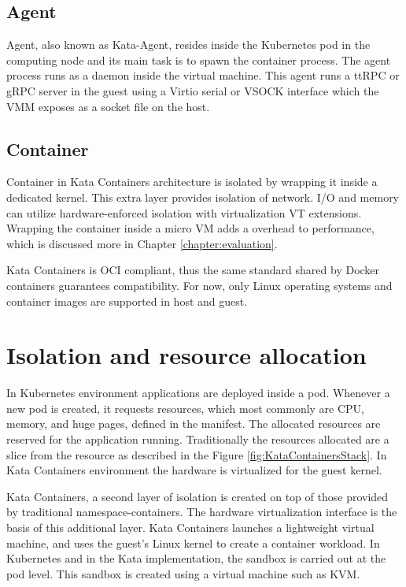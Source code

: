 \subsection{Agent}

Agent, also known as Kata-Agent, resides inside the Kubernetes pod in the computing node and its main task is to spawn the container process. The agent process runs as a daemon inside the virtual machine. This agent runs a ttRPC or gRPC server in the guest using a Virtio serial or VSOCK interface which the VMM exposes as a socket file on the host. \cite{KataContainersArchitecture}

\subsection{Container}

Container in Kata Containers architecture is isolated by wrapping it inside a dedicated kernel. This extra layer provides isolation of network. I/O and memory can utilize hardware-enforced isolation with virtualization VT extensions. Wrapping the container inside a micro VM adds a overhead to performance, which is discussed more in Chapter \ref{chapter:evaluation}. \cite{KataContainers}

Kata Containers is OCI compliant, thus the same standard shared by Docker containers guarantees compatibility. For now, only Linux operating systems and container images are supported in host and guest.

\section{Isolation and resource allocation}

In Kubernetes environment applications are deployed inside a pod. Whenever a new pod is created, it requests resources, which most commonly are CPU, memory, and huge pages, defined in the manifest. The allocated resources are reserved for the application running. Traditionally the resources allocated are a slice from the resource as described in the Figure \ref{fig:KataContainersStack}. In Kata Containers environment the hardware is virtualized for the guest kernel.

Kata Containers, a second layer of isolation is created on top of those provided by traditional namespace-containers. The hardware virtualization interface is the basis of this additional layer. Kata Containers launches a lightweight virtual machine, and uses the guest's Linux kernel to create a container workload. In Kubernetes and in the Kata implementation, the sandbox is carried out at the pod level. This sandbox is created using a virtual machine such as KVM. \cite{KataContainersVirtualization}

